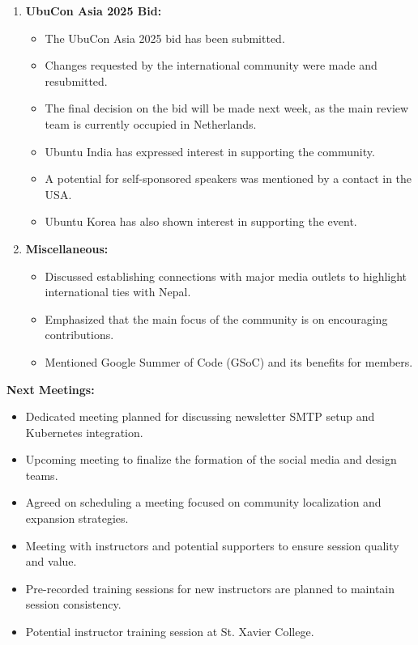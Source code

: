 \documentclass[a4paper,11pt]{article}
\begin{document}
\begin{enumerate}[label=\arabic*.]
    \item \textbf{UbuCon Asia 2025 Bid:} \\
    \begin{itemize}
        \item The UbuCon Asia 2025 bid has been submitted.
        \item Changes requested by the international community were made and resubmitted.
        \item The final decision on the bid will be made next week, as the main review team is currently occupied in Netherlands.
        \item Ubuntu India has expressed interest in supporting the community.
        \item A potential for self-sponsored speakers was mentioned by a contact in the USA.
        \item Ubuntu Korea has also shown interest in supporting the event.
    \end{itemize}

    
    \item \textbf{Miscellaneous:} \\
    \begin{itemize}
        \item Discussed establishing connections with major media outlets to highlight international ties with Nepal.
        \item Emphasized that the main focus of the community is on encouraging contributions.
        \item Mentioned Google Summer of Code (GSoC) and its benefits for members.
    \end{itemize}

\end{enumerate}

\vspace{0.5cm}
\newpage
\noindent\textbf{Next Meetings:} 
\begin{itemize}
    \item Dedicated meeting planned for discussing newsletter SMTP setup and Kubernetes integration.
    \item Upcoming meeting to finalize the formation of the social media and design teams.
    \item Agreed on scheduling a meeting focused on community localization and expansion strategies.
    \item Meeting with instructors and potential supporters to ensure session quality and value.
    \item Pre-recorded training sessions for new instructors are planned to maintain session consistency.
    \item Potential instructor training session at St. Xavier College.
\end{itemize}
\end{document}
